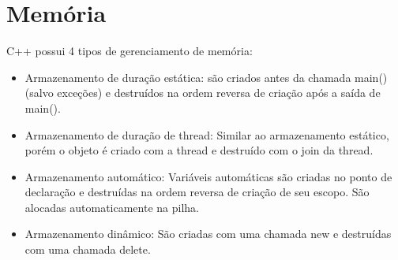 \documentclass[rel_mlp]{iiufrgs}
\begin{document}
\section{Memória}
C++ possui 4 tipos de gerenciamento de memória:
\begin{itemize}
	\item Armazenamento de duração estática: são criados antes da chamada main() (salvo exceções) e destruídos na ordem reversa de criação após a saída de main().
	\item Armazenamento de duração de thread: Similar ao armazenamento estático, porém o objeto é criado com a thread e destruído com o join da thread.
	\item Armazenamento automático: Variáveis automáticas são criadas no ponto de declaração e destruídas na ordem reversa de criação de seu escopo. São alocadas automaticamente na pilha.
	\item Armazenamento dinâmico: São criadas com uma chamada new e destruídas com uma chamada delete.
\end{itemize}
\end{document}

